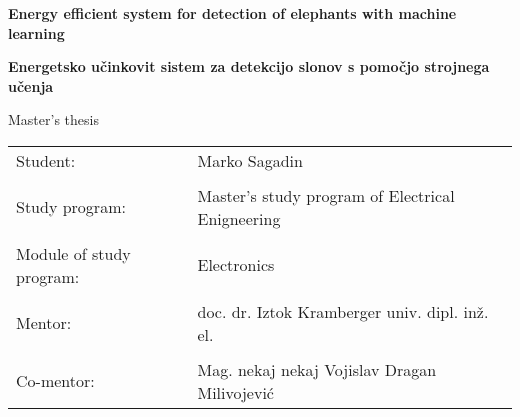 \begin{titlepage}
    \begin{center}
 
        \vspace*{4.0cm}
        \fontsize{26}{26}
        \selectfont
        \textbf{Energy efficient system for detection of elephants with machine learning}
 
        \vspace{1.0cm}

        \fontsize{26}{26}
        \selectfont
        \textbf{Energetsko učinkovit sistem za detekcijo slonov s pomočjo strojnega učenja}

        \vspace{1.0cm}

        \fontsize{16}{18}
        \selectfont
        Master's thesis
 
        \vspace{6cm}
 
    \end{center}


    \begin{tabular}{ l l }
    Student: & Marko Sagadin  \\ 
    & \\
    Study program: & Master's study program of Electrical Enigneering  \\  
    & \\
    Module of study program: & Electronics \\
    & \\
    Mentor: & doc. dr. Iztok Kramberger univ. dipl. inž. el. \\
    & \\
    Co-mentor: & Mag. nekaj nekaj Vojislav Dragan Milivojević \\
    \end{tabular}

\end{titlepage}
